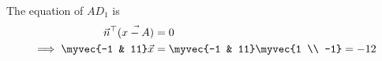 \solution
The equation of $AD_1$ is
\begin{align}
 \vec{n}^{\top}(\vec{x-A}) &= 0 \\
\implies \myvec{-1 & 11}\vec{x} &= \myvec{-1 & 11}\myvec{1 \\ -1}
= -12
\end{align}
